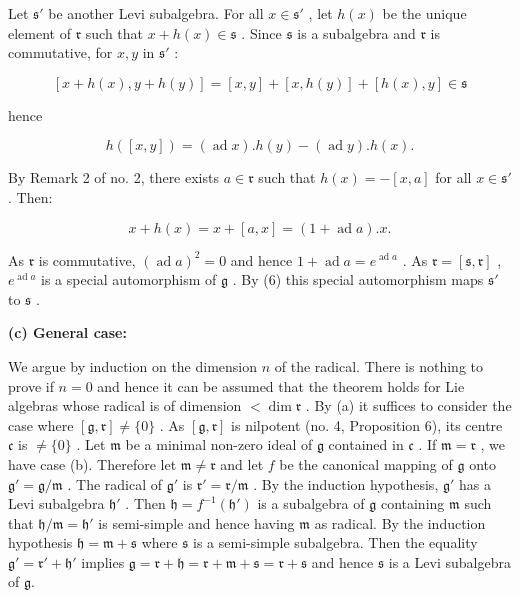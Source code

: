 Let \(\mathfrak{s}'\) be another Levi subalgebra. For all \(x \in \mathfrak{s}'\) , let \(h(x)\) be the unique element of \(\mathfrak{r}\) such that \(x + h(x) \in \mathfrak{s}\) . Since \(\mathfrak{s}\) is a subalgebra and \(\mathfrak{r}\) is commutative, for \(x, y\) in \(\mathfrak{s}'\) :

\[
[ x + h (x), y + h (y) ] = [ x, y ] + [ x, h (y) ] + [ h (x), y ] \in \mathfrak {s}
\]

hence

\[
h ([ x, y ]) = (\operatorname{ad} x). h (y) - (\operatorname{ad} y). h (x).
\]

By Remark 2 of no. 2, there exists \(a \in \mathfrak{r}\) such that \(h(x) = -[x, a]\) for all \(x \in \mathfrak{s}'\) . Then:

\[
x + h (x) = x + [ a, x ] = (1 + \operatorname{ad} a). x.\tag{6}
\]

As \(\mathfrak{r}\) is commutative, \((\operatorname{ad} a)^2 = 0\) and hence \(1 + \operatorname{ad} a = e^{\operatorname{ad} a}\) . As \(\mathfrak{r} = [\mathfrak{s}, \mathfrak{r}]\) , \(e^{\operatorname{ad} a}\) is a special automorphism of \(\mathfrak{g}\) . By (6) this special automorphism maps \(\mathfrak{s}'\) to \(\mathfrak{s}\) .

\textbf{(c) General case:}

We argue by induction on the dimension \(n\) of the radical. There is nothing to prove if \(n = 0\) and hence it can be assumed that the theorem holds for Lie algebras whose radical is of dimension \(<\dim \mathfrak{r}\) . By (a) it suffices to consider the case where \([\mathfrak{g}, \mathfrak{r}] \neq \{0\}\) . As \([\mathfrak{g}, \mathfrak{r}]\) is nilpotent (no. 4, Proposition 6), its centre \(\mathfrak{c}\) is \(\neq \{0\}\) . Let \(\mathfrak{m}\) be a minimal non-zero ideal of \(\mathfrak{g}\) contained in \(\mathfrak{c}\) . If \(\mathfrak{m} = \mathfrak{r}\) , we have case (b). Therefore let \(\mathfrak{m} \neq \mathfrak{r}\) and let \(f\) be the canonical mapping of \(\mathfrak{g}\) onto \(\mathfrak{g}' = \mathfrak{g}/\mathfrak{m}\) . The radical of \(\mathfrak{g}'\) is \(\mathfrak{r}' = \mathfrak{r}/\mathfrak{m}\) . By the induction hypothesis, \(\mathfrak{g}'\) has a Levi subalgebra \(\mathfrak{h}'\) . Then \(\mathfrak{h} = f^{-1}(\mathfrak{h}')\) is a subalgebra of \(\mathfrak{g}\) containing \(\mathfrak{m}\) such that \(\mathfrak{h}/\mathfrak{m} = \mathfrak{h}'\) is semi-simple and hence having \(\mathfrak{m}\) as radical. By the induction hypothesis \(\mathfrak{h} = \mathfrak{m} + \mathfrak{s}\) where \(\mathfrak{s}\) is a semi-simple subalgebra. Then the equality \(\mathfrak{g}' = \mathfrak{r}' + \mathfrak{h}'\) implies \(\mathfrak{g} = \mathfrak{r} + \mathfrak{h} = \mathfrak{r} + \mathfrak{m} + \mathfrak{s} = \mathfrak{r} + \mathfrak{s}\) and hence \(\mathfrak{s}\) is a Levi subalgebra of \(\mathfrak{g}\).

